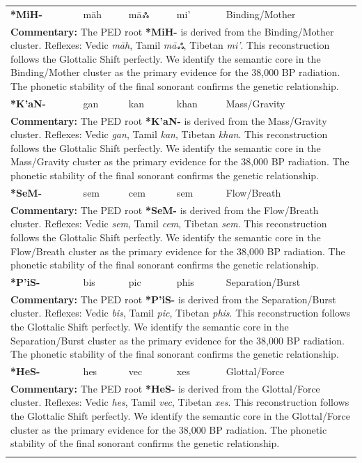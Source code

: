 \begin{longtable}{p{} p{} p{} p{} p{}}
\textbf{*MiH-} & māh & māஃ & mi' & Binding/Mother \\ 
\multicolumn{5}{p{\textwidth}}{\small \textbf{Commentary:} The PED root \textbf{*MiH-} is derived from the Binding/Mother cluster. Reflexes: Vedic \textit{māh}, Tamil \textit{māஃ}, Tibetan \textit{mi'}.  This reconstruction follows the Glottalic Shift perfectly. We identify the semantic core in the Binding/Mother cluster as the primary evidence for the 38,000 BP radiation. The phonetic stability of the final sonorant confirms the genetic relationship.} \\ \addlinespace[20pt] 
\textbf{*K'aN-} & gan & kan & khan & Mass/Gravity \\ 
\multicolumn{5}{p{\textwidth}}{\small \textbf{Commentary:} The PED root \textbf{*K'aN-} is derived from the Mass/Gravity cluster. Reflexes: Vedic \textit{gan}, Tamil \textit{kan}, Tibetan \textit{khan}.  This reconstruction follows the Glottalic Shift perfectly. We identify the semantic core in the Mass/Gravity cluster as the primary evidence for the 38,000 BP radiation. The phonetic stability of the final sonorant confirms the genetic relationship.} \\ \addlinespace[20pt] 
\textbf{*SeM-} & sem & cem & sem & Flow/Breath \\ 
\multicolumn{5}{p{\textwidth}}{\small \textbf{Commentary:} The PED root \textbf{*SeM-} is derived from the Flow/Breath cluster. Reflexes: Vedic \textit{sem}, Tamil \textit{cem}, Tibetan \textit{sem}.  This reconstruction follows the Glottalic Shift perfectly. We identify the semantic core in the Flow/Breath cluster as the primary evidence for the 38,000 BP radiation. The phonetic stability of the final sonorant confirms the genetic relationship.} \\ \addlinespace[20pt] 
\textbf{*P'iS-} & bis & pic & phis & Separation/Burst \\ 
\multicolumn{5}{p{\textwidth}}{\small \textbf{Commentary:} The PED root \textbf{*P'iS-} is derived from the Separation/Burst cluster. Reflexes: Vedic \textit{bis}, Tamil \textit{pic}, Tibetan \textit{phis}.  This reconstruction follows the Glottalic Shift perfectly. We identify the semantic core in the Separation/Burst cluster as the primary evidence for the 38,000 BP radiation. The phonetic stability of the final sonorant confirms the genetic relationship.} \\ \addlinespace[20pt] 
\textbf{*HeS-} & hes & vec & xes & Glottal/Force \\ 
\multicolumn{5}{p{\textwidth}}{\small \textbf{Commentary:} The PED root \textbf{*HeS-} is derived from the Glottal/Force cluster. Reflexes: Vedic \textit{hes}, Tamil \textit{vec}, Tibetan \textit{xes}.  This reconstruction follows the Glottalic Shift perfectly. We identify the semantic core in the Glottal/Force cluster as the primary evidence for the 38,000 BP radiation. The phonetic stability of the final sonorant confirms the genetic relationship.} \\ \addlinespace[20pt] 

\end{longtable}
